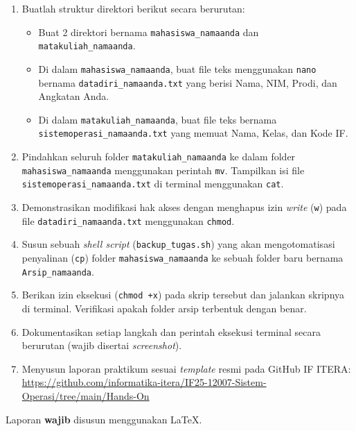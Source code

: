 \begin{enumerate}
	\item Buatlah struktur direktori berikut secara berurutan:
	\begin{itemize}
		\item Buat 2 direktori bernama \texttt{mahasiswa\_namaanda} dan \texttt{matakuliah\_namaanda}.
		\item Di dalam \texttt{mahasiswa\_namaanda}, buat file teks menggunakan \texttt{nano} bernama \texttt{datadiri\_namaanda.txt} yang berisi Nama, NIM, Prodi, dan Angkatan Anda.
		\item Di dalam \texttt{matakuliah\_namaanda}, buat file teks bernama \texttt{sistemoperasi\_namaanda.txt} yang memuat Nama, Kelas, dan Kode IF.
	\end{itemize}
	\item Pindahkan seluruh folder \texttt{matakuliah\_namaanda} ke dalam folder \texttt{mahasiswa\_namaanda} menggunakan perintah \texttt{mv}. Tampilkan isi file \texttt{sistemoperasi\_namaanda.txt} di terminal menggunakan \texttt{cat}.
	\item Demonstrasikan modifikasi hak akses dengan menghapus izin \textit{write} (\texttt{w}) pada file \texttt{datadiri\_namaanda.txt} menggunakan \texttt{chmod}.
	\item Susun sebuah \textit{shell script} (\texttt{backup\_tugas.sh}) yang akan mengotomatisasi penyalinan (\texttt{cp}) folder \texttt{mahasiswa\_namaanda} ke sebuah folder baru bernama \texttt{Arsip\_namaanda}.
	\item Berikan izin eksekusi (\texttt{chmod +x}) pada skrip tersebut dan jalankan skripnya di terminal. Verifikasi apakah folder arsip terbentuk dengan benar.
	\item Dokumentasikan setiap langkah dan perintah eksekusi terminal secara berurutan (wajib disertai \textit{screenshot}).
	\item Menyusun laporan praktikum sesuai \textit{template} resmi pada GitHub IF ITERA: \\
	\url{https://github.com/informatika-itera/IF25-12007-Sistem-Operasi/tree/main/Hands-On}
\end{enumerate}

Laporan \textbf{wajib} disusun menggunakan \LaTeX.